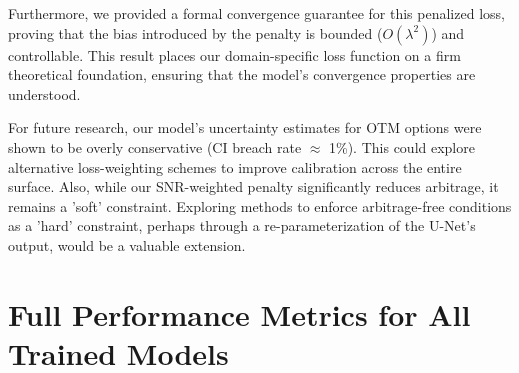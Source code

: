 \documentclass{article}
\begin{document}
Furthermore, we provided a formal convergence guarantee for this penalized loss, proving that the bias introduced by the penalty is bounded ($O(\lambda^2)$) and controllable. This result places our domain-specific loss function on a firm theoretical foundation, ensuring that the model's convergence properties are understood.

For future research, our model's uncertainty estimates for OTM options were shown to be overly conservative (CI breach rate $\approx$ 1\%). This could explore alternative loss-weighting schemes to improve calibration across the entire surface. Also, while our SNR-weighted penalty significantly reduces arbitrage, it remains a 'soft' constraint. Exploring methods to enforce arbitrage-free conditions as a 'hard' constraint, perhaps through a re-parameterization of the U-Net's output, would be a valuable extension.




\appendix
\section{Full Performance Metrics for All Trained Models}
\label{sec:appendix_full_table}
\end{document}
